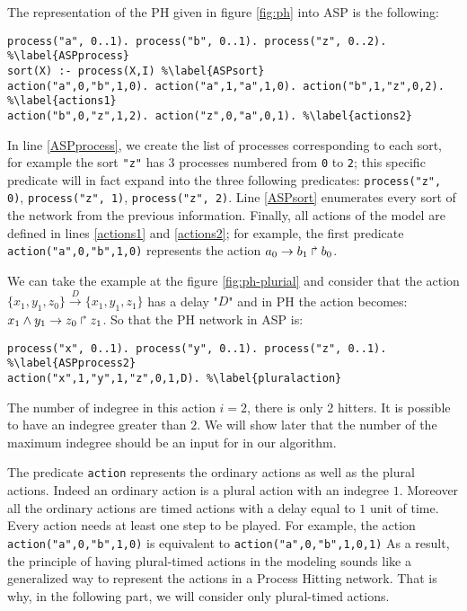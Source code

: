 \begin{example}
\label{ex1:asp-ph}
The representation of the PH given in figure \ref{fig:ph} into ASP is the following:
\begin{lstlisting}
process("a", 0..1). process("b", 0..1). process("z", 0..2). %\label{ASPprocess}
sort(X) :- process(X,I) %\label{ASPsort}
action("a",0,"b",1,0). action("a",1,"a",1,0). action("b",1,"z",0,2). %\label{actions1}
action("b",0,"z",1,2). action("z",0,"a",0,1). %\label{actions2}
\end{lstlisting}
In line \ref{ASPprocess}, we create the list of processes corresponding to each sort,
for example the sort \texttt{"z"} has 3 processes numbered from \texttt{0} to \texttt{2};
this specific predicate will in fact expand into the three following predicates:
\texttt{process("z", 0)}, \texttt{process("z", 1)}, \texttt{process("z", 2)}.
Line \ref{ASPsort} enumerates every sort of the network from the previous information.
Finally, all actions of the model are defined in lines \ref{actions1} and \ref{actions2};
for example, the first predicate \texttt{action("a",0,"b",1,0)} represents the action
$a_0\rightarrow b_1\Rsh b_0$.
\end{example}

\begin{example}
\label{ex2:ph-asp}
We can take the example at the figure \ref{fig:ph-plurial} and consider that the action  $\{x_1, y_1, z_0 \} \xrightarrow{D} \{x_1, y_1, z_1 \} $  has a delay "$D$" and in PH the action becomes: $x_1 \wedge y_1\rightarrow z_0\Rsh z_1$. So that the PH  network in ASP is:
\begin{lstlisting}
process("x", 0..1). process("y", 0..1). process("z", 0..1). %\label{ASPprocess2}
action("x",1,"y",1,"z",0,1,D). %\label{pluralaction}
\end{lstlisting}
The number of indegree in this action $i=2$, there is only 2 hitters. It is possible to have an indegree greater than $2$. We will show later that the number of the maximum indegree should be an input for in our algorithm.
\end{example}

The predicate \texttt{action} represents the ordinary actions as well as the plural actions. Indeed an ordinary action is a plural action with an indegree $1$. Moreover all the ordinary actions are timed actions with a delay equal to $1$ unit of time. Every action needs at least one step to be played. For example, the action \texttt{action("a",0,"b",1,0)} is equivalent to \texttt{action("a",0,"b",1,0,1)}
As a result, the principle of having plural-timed actions in the modeling sounds like a generalized way to represent the actions in a Process Hitting network. That is why, in the following part, we will consider only plural-timed actions. 
	
